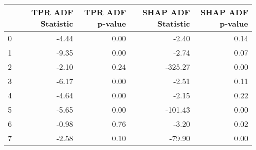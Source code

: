 \begin{tabular}{lrrrr}
\toprule
 & TPR ADF Statistic & TPR ADF p-value & SHAP ADF Statistic & SHAP ADF p-value \\
\midrule
0 & -4.44 & 0.00 & -2.40 & 0.14 \\
1 & -9.35 & 0.00 & -2.74 & 0.07 \\
2 & -2.10 & 0.24 & -325.27 & 0.00 \\
3 & -6.17 & 0.00 & -2.51 & 0.11 \\
4 & -4.64 & 0.00 & -2.15 & 0.22 \\
5 & -5.65 & 0.00 & -101.43 & 0.00 \\
6 & -0.98 & 0.76 & -3.20 & 0.02 \\
7 & -2.58 & 0.10 & -79.90 & 0.00 \\
\bottomrule
\end{tabular}
